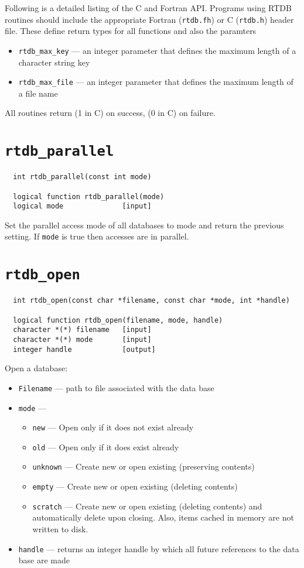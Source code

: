 Following is a detailed listing of the C and Fortran API\@.  
Programs using RTDB routines should include the appropriate Fortran
({\tt rtdb.fh}) or C ({\tt rtdb.h}) header file.   These define return
types for all functions and also the paramters 
\begin{itemize}
\item {\tt rtdb\_max\_key} --- an integer parameter that defines the maximum
  length of a character string key
\item {\tt rtdb\_max\_file} --- an integer parameter that defines the maximum
  length of a file name
\end{itemize}
All routines return \TRUE (1 in C) on success, \FALSE (0
in C) on failure.

\section{{\tt rtdb\_parallel}}
\begin{verbatim}
  int rtdb_parallel(const int mode)

  logical function rtdb_parallel(mode)
  logical mode              [input]
\end{verbatim}
Set the parallel access mode of all databases to mode and return the
previous setting. If {\tt mode} is true then accesses are in parallel.

\section{{\tt rtdb\_open}}
\begin{verbatim}
  int rtdb_open(const char *filename, const char *mode, int *handle)

  logical function rtdb_open(filename, mode, handle)
  character *(*) filename   [input]
  character *(*) mode       [input]
  integer handle            [output]
\end{verbatim}
Open a database:
\begin{itemize}
\item    {\tt Filename} --- path to file associated with the data base
\item    {\tt mode} ---
\begin{itemize}
\item {\tt new} ---  Open only if it does not exist already
\item {\tt old} ---  Open only if it does exist already
\item {\tt unknown} --- Create new or open existing (preserving contents)
\item {\tt empty} --- Create new or open existing (deleting contents)
\item {\tt scratch} --- Create new or open existing (deleting contents)
                         and automatically delete upon closing.  Also, items
                         cached in memory are not written to disk.
\end{itemize}
\item {\tt handle} --- returns an integer handle by which all future
  references to the data base are made
\end{itemize}

